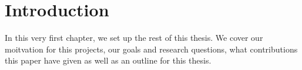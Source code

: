 \chapter{Introduction}
\label{chap:introduction}

In this very first chapter, we set up the rest of this thesis. We cover our moitvation for this projects, our goals and research questions, what contributions this paper have given as well as an outline for this thesis.





